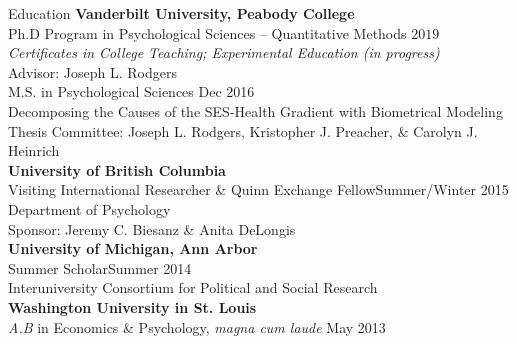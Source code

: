 \begin{rSection}{\textrm{Education}}
{\bf Vanderbilt University, Peabody College}\\
Ph.D Program in Psychological Sciences -- Quantitative Methods \hfill{$2019$}\\%
\hspace*{\pindent}\textit{Certificates in College Teaching; Experimental Education (in progress)}\\
\hspace*{\pindent}Advisor: Joseph L. Rodgers%
\smallskip\\
M.S. in Psychological Sciences \hfill{Dec 2016} \\
\hspace*{\pindent}Decomposing the Causes of the SES-Health Gradient with Biometrical Modeling\\
\hspace*{\pindent}Thesis Committee: Joseph L. Rodgers, Kristopher J. Preacher, \& Carolyn J. Heinrich %
\medskip\\
\textbf{University of British Columbia}\\
Visiting International Researcher \& Quinn Exchange Fellow\hfill{Summer/Winter 2015}\\
\hspace*{\pindent}Department of Psychology\\
\hspace*{\pindent}Sponsor: Jeremy C. Biesanz \& Anita DeLongis\medskip\\
\textbf{University of Michigan, Ann Arbor}\\
Summer Scholar\hfill{Summer 2014}\\
\hspace*{\pindent}Interuniversity Consortium for Political and Social Research\medskip\\
{\bf Washington University in St. Louis}\\
{\em A.B} in Economics \& Psychology, \textit{magna cum laude} \hfill{May 2013}%
\end{rSection}